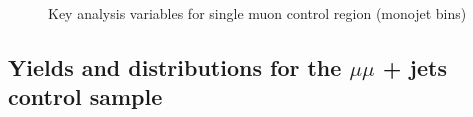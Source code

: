 \begin{figure}
\begin{center}
         \\
        \caption{Key analysis variables for single muon control region (monojet bins)}
        \label{fig:distribution_singlemu_mono}
    \end{center}
\end{figure}

\clearpage
\subsection{Yields and distributions for the $\mu\mu$ + jets control sample}





